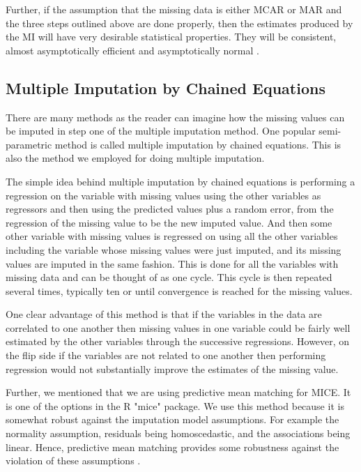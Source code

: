 \documentclass[fleqn,10pt]{wlscirep}\usepackage[]{graphicx}\usepackage[]{color}
\begin{document}
Further, if the assumption that the missing data is either MCAR or MAR and the three steps outlined above are done properly, then the estimates produced by the MI will have very desirable statistical properties. They will be consistent, almost asymptotically efficient and asymptotically normal \cite{allison2012handling}.


\subsection{Multiple Imputation by Chained Equations}

There are many methods as the reader can imagine how the missing values can be imputed in step one of the multiple imputation method. One popular semi-parametric method is called multiple imputation by chained equations\cite{Sterneb2393}. This is also the method we employed for doing multiple imputation. 

The simple idea behind multiple imputation by chained equations is performing a regression on the variable with missing values using the other variables as regressors and then using the predicted values plus a random error, from the regression of the missing value to be the new imputed value. And then some other variable with missing values is regressed on using all the other variables including the variable whose missing values were just imputed, and its missing values are imputed in the same fashion. This is done for all the variables with missing data and can be thought of as one cycle. This cycle is then repeated several times, typically ten or until convergence is reached for the missing values.\cite{Azur:2011, allison2012handling}

One clear advantage of this method is that if the variables in the data are correlated to one another then missing values in one variable could be fairly well estimated by the other variables through the successive regressions. However, on the flip side if the variables are not related to one another then performing regression would not substantially improve the estimates of the missing value. 

Further, we mentioned that we are using predictive mean matching for MICE. It is one of the options in the R "mice" package. We use this method because it is somewhat robust against the imputation model assumptions. For example the normality assumption, residuals being homoscedastic, and the associations being linear. Hence, predictive mean matching provides some robustness against the violation of these assumptions \cite{morris2014tuning}. 
\end{document}
